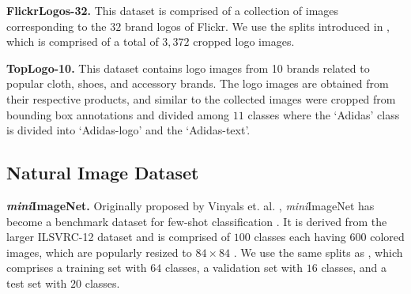 \documentclass[10pt,journal,compsoc]{IEEEtran}
\begin{document}
    \noindent \textbf{FlickrLogos-32.} This dataset \cite{flickr} is comprised of a collection of images corresponding to the $32$ brand logos of Flickr.  We use the splits introduced in \cite{kim2019variational}, which is comprised of a total of $3,372$ cropped logo images. 
    
    \noindent \textbf{TopLogo-10.} This dataset \cite{toplogo} contains logo images from 10 brands related to popular cloth, shoes, and accessory brands. The logo images are obtained from their respective products, and similar to \cite{kim2019variational} the collected images were cropped from bounding box annotations and divided among $11$ classes where the ‘Adidas’ class is divided into ‘Adidas-logo’ and the ‘Adidas-text’. 
    
    \subsection{Natural Image Dataset}
    
    \noindent \textbf{\textit{mini}ImageNet.} Originally proposed by Vinyals et. al. \cite{match_net}, \textit{mini}ImageNet has become a benchmark dataset for few-shot classification \cite{proto_net,peeler}. It is derived from the larger ILSVRC-12 dataset \cite{imagenet} and is comprised of $100$ classes each having $600$ colored images, which are popularly resized to $84 \times 84$ \cite{proto_net,match_net}. We use the same splits as \cite{match_net}, which comprises a training set with $64$ classes, a validation set with $16$ classes, and a test set with $20$ classes.

\end{document}

